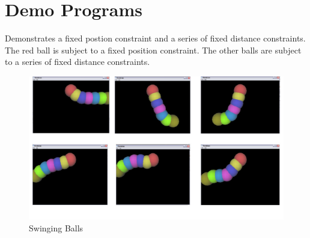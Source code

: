 \chapter{Demo Programs}
Demonstrates a fixed postion constraint and a series of fixed distance
constraints. The red ball is subject to a fixed position constraint. The other
balls are subject to a series of fixed distance constraints.
\begin{figure}
    \label{Fig:Balls}
    \centering
	\includegraphics[width=1\textwidth]{Balls}    
    \caption{Swinging Balls}
\end{figure}

